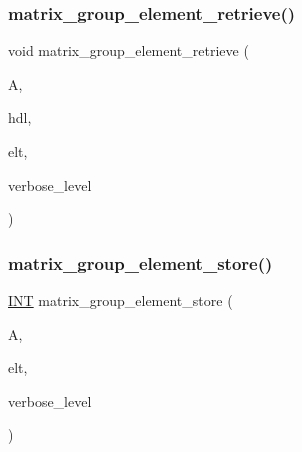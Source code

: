 \subsubsection{\texorpdfstring{matrix\+\_\+group\+\_\+element\+\_\+retrieve()}{matrix\_group\_element\_retrieve()}}
{\footnotesize\ttfamily void matrix\+\_\+group\+\_\+element\+\_\+retrieve (\begin{DoxyParamCaption}\item[{\mbox{\hyperlink{classaction}{action}} \&}]{A,  }\item[{\mbox{\hyperlink{galois_8h_a09fddde158a3a20bd2dcadb609de11dc}{I\+NT}}}]{hdl,  }\item[{void $\ast$}]{elt,  }\item[{\mbox{\hyperlink{galois_8h_a09fddde158a3a20bd2dcadb609de11dc}{I\+NT}}}]{verbose\+\_\+level }\end{DoxyParamCaption})}

\mbox{\label{interface__matrix__group_8_c_a022239b4366d52af91901716d626b518}} 
\subsubsection{\texorpdfstring{matrix\+\_\+group\+\_\+element\+\_\+store()}{matrix\_group\_element\_store()}}
{\footnotesize\ttfamily \mbox{\hyperlink{galois_8h_a09fddde158a3a20bd2dcadb609de11dc}{I\+NT}} matrix\+\_\+group\+\_\+element\+\_\+store (\begin{DoxyParamCaption}\item[{\mbox{\hyperlink{classaction}{action}} \&}]{A,  }\item[{void $\ast$}]{elt,  }\item[{\mbox{\hyperlink{galois_8h_a09fddde158a3a20bd2dcadb609de11dc}{I\+NT}}}]{verbose\+\_\+level }\end{DoxyParamCaption})}

\mbox{\label{interface__matrix__group_8_c_aaf36ae3e69210e41138ede347ca87e17}} 
